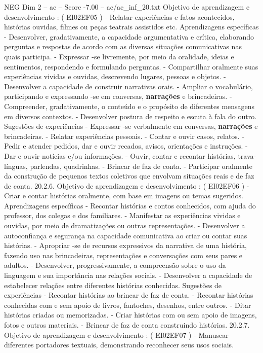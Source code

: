 \begin{textsample}{NEG Dim 2 – ac – Score -7.00 – ac/ac\_inf\_20.txt}
Objetivo de aprendizagem e desenvolvimento : ( EI02EF05 ) - Relatar experiências e fatos acontecidos, histórias ouvidas, filmes ou peças teatrais assistidos etc.
Aprendizagens específicas - Desenvolver, gradativamente, a capacidade argumentativa e crítica, elaborando perguntas e respostas de acordo com as diversas situações comunicativas nas quais participa. - Expressar -se livremente, por meio da oralidade, ideias e sentimentos, respondendo e formulando perguntas. - Compartilhar oralmente suas experiências vividas e ouvidas, descrevendo lugares, pessoas e objetos. - Desenvolver a capacidade de construir narrativas orais. - Ampliar o vocabulário, participando e expressando -se em conversas, \textbf{narrações} e brincadeiras. - Compreender, gradativamente, o conteúdo e o propósito de diferentes mensagens em diversos contextos. - Desenvolver postura de respeito e escuta à fala do outro.
Sugestões de experiências - Expressar -se verbalmente em conversas, \textbf{narrações} e brincadeiras. - Relatar experiências pessoais. - Contar e ouvir casos, relatos. - Pedir e atender pedidos, dar e ouvir recados, avisos, orientações e instruções. - Dar e ouvir notícias e/ou informações. - Ouvir, contar e recontar histórias, trava-línguas, parlendas, quadrinhas. - Brincar de faz de conta. - Participar oralmente da construção de pequenos textos coletivos que envolvam situações reais e de faz de conta. 20.2.6.
Objetivo de aprendizagem e desenvolvimento : ( EI02EF06 ) - Criar e contar histórias oralmente, com base em imagens ou temas sugeridos.
Aprendizagens específicas - Recontar histórias e contos conhecidos, com ajuda do professor, dos colegas e dos familiares. - Manifestar as experiências vividas e ouvidas, por meio de dramatizações ou outras representações. - Desenvolver a autoconfiança e segurança na capacidade comunicativa ao criar ou contar suas histórias. - Apropriar -se de recursos expressivos da narrativa de uma história, fazendo uso nas brincadeiras, representações e conversações com seus pares e adultos. - Desenvolver, progressivamente, a compreensão sobre o uso da linguagem e sua importância nas relações sociais. - Desenvolver a capacidade de estabelecer relações entre diferentes histórias conhecidas.
Sugestões de experiências - Recontar histórias ao brincar de faz de conta. - Recontar histórias conhecidas com e sem apoio de livros, fantoches, desenhos, entre outros. - Ditar histórias criadas ou memorizadas. - Criar histórias com ou sem apoio de imagens, fotos e outros materiais. - Brincar de faz de conta construindo histórias. 20.2.7.
Objetivo de aprendizagem e desenvolvimento : ( EI02EF07 ) - Manusear diferentes portadores textuais, demonstrando reconhecer seus usos sociais.

\end{textsample}
